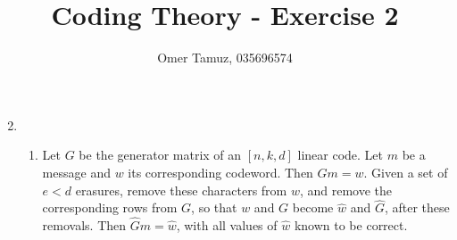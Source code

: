 \documentclass[11pt]{article} \usepackage{amssymb}
\begin{document}
\title{Coding Theory - Exercise 2}

 \author{Omer Tamuz, 035696574}
\maketitle

\begin{enumerate}
\setcounter{enumi}{1}
\item 
\begin{enumerate}
\item
Let $G$ be the generator matrix of an $[n,k,d]$ linear code. Let $m$ be
a message and $w$ its corresponding codeword. Then $Gm=w$. Given a
set of $e<d$ erasures, remove these characters from $w$, and remove
the corresponding rows from $G$, so that $w$ and $G$ become $\hat{w}$ and $\hat{G}$, 
after these removals. 
Then $\hat{G}m=\hat{w}$, with all values of $\hat{w}$
known to be correct.


\end{enumerate}
\end{enumerate}
\end{document}
